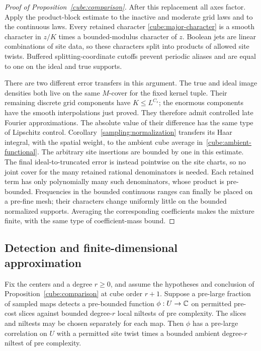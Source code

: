 \begin{proof}[Proof of Proposition~\ref{cube:comparison}]
After this replacement all axes factor.  Apply the product-block
estimate to the inactive and moderate grid laws and to the
continuous laws.  Every retained character
\eqref{cube:major-character} is a smooth character in $z/K$ times a
bounded-modulus character of $z$.  Boolean jets are linear
combinations of site data, so these characters split into products
of allowed site twists.  Buffered splitting-coordinate cutoffs
prevent periodic aliases and are equal to one on the ideal and true
supports.

There are two different error transfers in this argument.  The true
and ideal image densities both live on the same $M$-cover for the
fixed kernel tuple.  Their remaining discrete grid components have
$K\le L^{C_s}$; the enormous components have the smooth
interpolations just proved.  They therefore admit controlled late
Fourier approximations.  The absolute value of their difference has
the same type of Lipschitz control.  Corollary~\ref{sampling:normalization}
transfers its Haar integral, with the spatial weight, to the ambient
cube average in~\eqref{cube:ambient-functional}.  The arbitrary site
insertions are bounded by one in this estimate.  The final
ideal-to-truncated error is instead pointwise on the site charts,
so no joint cover for the many retained rational denominators is
needed.  Each retained term has only polynomially many such
denominators, whose product is pre-bounded.  Frequencies in the
bounded continuous ranges can finally be placed on a pre-fine mesh;
their characters change uniformly little on the bounded normalized
supports.  Averaging the corresponding coefficients makes the
mixture finite, with the same type of coefficient-mass bound.
\end{proof}

\subsection{Detection and finite-dimensional approximation}

\begin{lemma}
\label{cube:pathwise-detection}
Fix the centers and a degree $r\ge0$, and assume the hypotheses and
conclusion of Proposition~\ref{cube:comparison} at cube order $r+1$.
Suppose a pre-large fraction of sampled maps detects a pre-bounded
function $\phi:U\to\mathbb C$ on permitted pre-cost slices against bounded
degree-$r$ local niltests of pre complexity.  The slices and niltests
may be chosen separately for each map.  Then $\phi$ has a pre-large
correlation on $U$ with a permitted site twist times a bounded
ambient degree-$r$ niltest of pre complexity.
\end{lemma}

